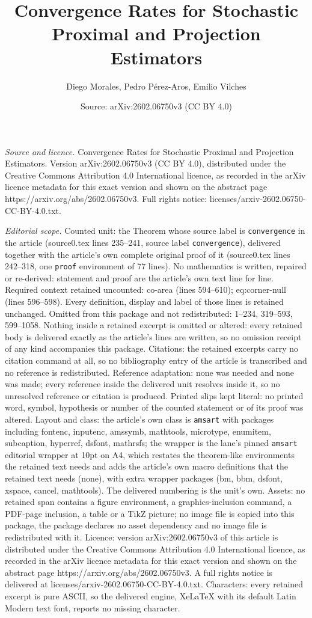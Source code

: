 \documentclass[10pt,a4paper]{amsart}
\title[Convergence Rates for Stochastic Proximal and Projection Est]{Convergence Rates for Stochastic Proximal and Projection Estimators}
\author{Diego Morales, Pedro P\'erez-Aros, Emilio Vilches}
\date{Source: arXiv:2602.06750v3 (CC BY 4.0)}
\begin{document}
\maketitle

\noindent\emph{Source and licence.} Convergence Rates for Stochastic Proximal and Projection Estimators. Version arXiv:2602.06750v3 (CC BY 4.0), distributed under the Creative Commons Attribution 4.0 International licence, as recorded in the arXiv licence metadata for this exact version and shown on the abstract page https://arxiv.org/abs/2602.06750v3. Full rights notice: licenses/arxiv-2602.06750-CC-BY-4.0.txt.\par\smallskip

\noindent\textit{Editorial scope.} Counted unit: the Theorem whose source label is \texttt{convergence} in the article (source0.tex lines 235--241, source label \texttt{convergence}), delivered together with the article's own complete original proof of it (source0.tex lines 242--318, one \texttt{proof} environment of 77 lines). No mathematics is written, repaired or re-derived: statement and proof are the article's own text line for line. Required context retained uncounted: co-area (lines 594--610); eq:corner-null (lines 596--598). Every definition, display and label of those lines is retained unchanged. Omitted from this package and not redistributed: 1--234, 319--593, 599--1058. Nothing inside a retained excerpt is omitted or altered: every retained body is delivered exactly as the article's lines are written, so no omission receipt of any kind accompanies this package. Citations: the retained excerpts carry no citation command at all, so no bibliography entry of the article is transcribed and no reference is redistributed. Reference adaptation: none was needed and none was made; every reference inside the delivered unit resolves inside it, so no unresolved reference or citation is produced. Printed slips kept literal: no printed word, symbol, hypothesis or number of the counted statement or of its proof was altered. Layout and class: the article's own class is \texttt{amsart} with packages including fontenc, inputenc, amssymb, mathtools, microtype, enumitem, subcaption, hyperref, dsfont, mathrsfs; the wrapper is the lane's pinned \texttt{amsart} editorial wrapper at 10pt on A4, which restates the theorem-like environments the retained text needs and adds the article's own macro definitions that the retained text needs (none), with extra wrapper packages (bm, bbm, dsfont, xspace, cancel, mathtools). The delivered numbering is the unit's own. Assets: no retained span contains a figure environment, a graphics-inclusion command, a PDF-page inclusion, a table or a TikZ picture; no image file is copied into this package, the package declares no asset dependency and no image file is redistributed with it. Licence: version arXiv:2602.06750v3 of this article is distributed under the Creative Commons Attribution 4.0 International licence, as recorded in the arXiv licence metadata for this exact version and shown on the abstract page https://arxiv.org/abs/2602.06750v3. A full rights notice is delivered at licenses/arxiv-2602.06750-CC-BY-4.0.txt. Characters: every retained excerpt is pure ASCII, so the delivered engine, XeLaTeX with its default Latin Modern text font, reports no missing character.
\end{document}
